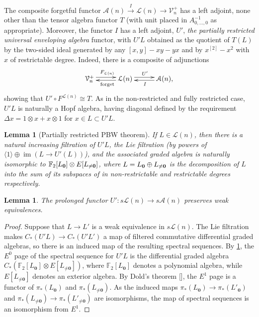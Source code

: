 \documentclass[11pt]{amsart}
\theoremstyle{plain}
\newtheorem{lem}[thm]{Lemma}
\theoremstyle{definition}
\DeclareMathOperator{\im}{im}
\renewcommand{\to}{\longrightarrow}
\newcommand{\calA}{\mathcal{A}}
\newcommand{\calL}{\mathcal{L}}
\newcommand{\calV}{\mathcal{V}}
\theoremstyle{plain}
\newcommand{\restn}[1]{#1^{[2]}}
\newcommand{\vect}[2]{\calV^{#1}_{#2}}
\newcommand{\UEA}{U'}%
\newcommand{\F}{\mathbb{F}}
\begin{document}
\begin{appendices}
The composite forgetful functor $\calA(n)\overset{I}{\to}\calL(n)\to\vect{+}{n}$ has a left adjoint, none other than the tensor algebra functor $T$ (with unit placed in $A^{-1}_{0,\ldots,0}$ as appropriate). Moreover, the functor $I$ has a left adjoint, $\UEA$, \emph{the partially restricted universal enveloping algebra} functor, with $\UEA L$ obtained as the quotient of $T(L)$ by the two-sided ideal generated by any $[x,y]-xy-yx$ and by $\restn{x}-x^2$ with $x$ of restrictable degree. Indeed, there is a composite of adjunctions
\[\xymatrix@R=.3cm@C=1cm{
\vect{+}{n}  \ar@<.6ex>[r]^{F_{\calL(n)}}&
\calL(n)  \ar@<.4ex>[l]^{\textup{forget}} \ar@<.6ex>[r]^{\UEA}&
\calA(n),  \ar@<.4ex>[l]^{I} 
}
\]
showing that $\UEA\circ F^{\calL(n)}\cong T$. As in the non-restricted and fully restricted case, $\UEA L$ is naturally a Hopf algebra, having diagonal defined by the requirement $\Delta x=1\otimes x+x\otimes 1$ for $x\in L\subset \UEA L$.
\begin{lem}[Partially restricted PBW theorem]\label{Partially restricted PBW theorem}
If $L\in\calL(n)$, then there is a natural increasing filtration of $\UEA L$, the Lie filtration (by powers of $\langle 1\rangle\oplus \im(L\to \UEA(L))$), and the associated graded algebra is naturally isomorphic to $\F_2[L_{\textup{\textbf{0}}}]\otimes E[L_{\neq\textup{\textbf{0}}}]$, where $L=L_{\textbf{\textup{0}}}\oplus L_{\neq\textbf{\textup{0}}}$ is the decomposition of $L$ into the sum of its subspaces of in non-restrictable and restrictable degrees respectively.
\end{lem}
\begin{lem}
The prolonged functor $\UEA:s\calL(n)\to s\calA(n)$ preserves weak equivalences.
\end{lem}
\begin{proof}
Suppose that $L\to L'$ is a weak equivalence in $s\calL(n)$. The Lie filtration makes $C_*(\UEA L)\to C_*(\UEA L')$ a map of filtered commutative differential graded algebras, so there is an induced map of the resulting spectral sequences. By \ref{Partially restricted PBW theorem}, the $E^0$ page of the spectral sequence for $\UEA L$ is the differential graded algebra $C_*(\F_2[L_{\textbf{0}}]\otimes E[L_{\neq\textbf{0}}])$, where $\F_2[L_{\textbf{0}}]$ denotes a polynomial algebra, while $E[L_{\neq\textbf{0}}]$ denotes an exterior algebra. By Dold's theorem [], the $E^1$ page is a functor of $\pi_*(L_{\textbf{0}})$ and $\pi_*(L_{\neq\textbf{0}})$. As the induced maps $\pi_*(L_{\textbf{0}})\to\pi_*(L'_{\textbf{0}})$ and $\pi_*(L_{\neq\textbf{0}})\to\pi_*(L'_{\neq\textbf{0}})$ are isomorphisms, the map of spectral sequences is an isomorphism from $E^1$.
\end{proof}


\end{appendices}
\end{document}
